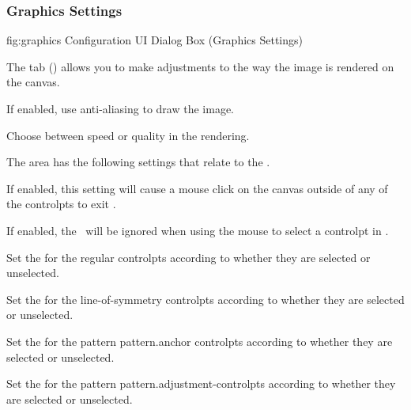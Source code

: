 \subsubsection{Graphics Settings}\label{sec:graphics}


\FloatFig
  {fig:graphics}
  {}
  {Configuration UI Dialog Box (Graphics Settings)}

The  tab ()
allows you to make adjustments to the way the image is rendered on
the \gls{canvas}.


If enabled, use \gls{anti-aliasing} to draw the image.


Choose between speed or quality in the \gls{rendering}.


The  area has the following settings that
relate to the \editpathmode.


If enabled, this setting will cause a mouse \gls{click} on the
\gls{canvas} outside of any of the \glspl{controlpt} to exit
\editpathmode.


If enabled, the \gridlock\ will be ignored when using the
mouse to select a \gls{controlpt} in \editpathmode.


Set the  for the regular
\glspl*{controlpt} according to whether they are selected or
unselected.


Set the  for the \gls{line-of-symmetry}
\glspl*{controlpt} according to whether they are selected or
unselected.


Set the  for the pattern \gls{pattern.anchor}
\glspl*{controlpt} according to whether they are selected or
unselected.


Set the  for the pattern 
\glspl*{pattern.adjustment-controlpt} according to whether they are selected or
unselected.

